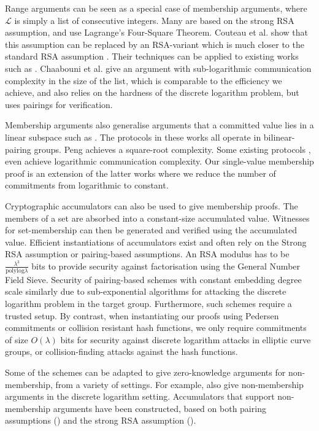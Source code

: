 Range arguments can be seen as a special case of membership arguments, where $\mathcal{L}$ is simply a list of consecutive integers. Many are based on the strong RSA assumption, and use Lagrange's Four-Square Theorem. Couteau et al. show that this assumption can be replaced by an RSA-variant which is much closer to the standard RSA assumption \cite{CouteauPP17}. Their techniques can be applied to existing works such as \cite{Groth05,Lip03}. Chaabouni et al.  \cite{Chaabouni2010} give an argument with sub-logarithmic communication complexity in the size of the list, which is comparable to the efficiency we achieve, and also relies on the hardness of the discrete logarithm problem, but uses pairings for verification.

Membership arguments also generalise arguments that a committed value lies in a linear subspace such as \cite{Jutla2013,Jutla2014,Kiltz2015}. The protocols in these works all operate in bilinear-pairing groups. Peng \cite{Peng2012} achieves a square-root complexity. Some existing protocols \cite{BayerG13}, \cite{GrothK15} even achieve logarithmic communication complexity. Our single-value membership proof is an extension of the latter works where we reduce the number of commitments from logarithmic to constant.

Cryptographic accumulators \cite{Benaloh1994,Ngu05,Camenisch2009,Camenisch2002} can also be used to give membership proofs. The members of a set are absorbed into a constant-size accumulated value. Witnesses for set-membership can then be generated and verified using the accumulated value. Efficient instantiations of accumulators exist and often rely on the Strong RSA assumption or pairing-based assumptions. An RSA modulus has to be $\frac{\lambda^3}{\mathrm{polylog}\lambda}$ bits to provide security against factorisation using the General Number Field Sieve. Security of pairing-based schemes with constant embedding degree scale similarly due to sub-exponential algorithms for attacking the discrete logarithm problem in the target group. Furthermore, such schemes require a trusted setup. By contrast, when instantiating our proofs using Pedersen commitments or collision resistant hash functions, we only require commitments of size $O(\lambda)$ bits for security against discrete logarithm attacks in elliptic curve groups, or collision-finding attacks against the hash functions.

Some of the schemes can be adapted to give zero-knowledge arguments for non-membership, from a variety of settings. For example, \cite{BayerG13,Peng2012} also give non-membership arguments in the discrete logarithm setting. Accumulators that support non-membership arguments have been constructed, based on both pairing assumptions (\cite{Damgard2008}) and the strong RSA assumption (\cite{Li2007}).


